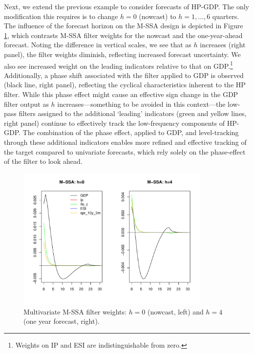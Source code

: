 \documentclass[11pt,a4paper]{article}
\begin{document}
Next, we extend the previous example to consider forecasts of HP-GDP. The only modification this requires is to change $h=0$ (nowcast) to $h=1,...,6$ quarters. %
The influence of the forecast horizon on the M-SSA design is depicted in Figure \ref{bk_h}, which contrasts M-SSA filter weights for the nowcast and the one-year-ahead forecast. Noting the difference in vertical scales, we see that as $h$ increases (right panel), the filter weights diminish, reflecting increased forecast uncertainty. We also see increased weight on the leading indicators relative to that on GDP.\footnote{Weights on IP and ESI are indistinguishable from zero.} Additionally, a phase shift associated with the filter applied to GDP is observed (black line, right panel), reflecting the cyclical characteristics inherent to the HP filter. While this phase effect might cause an effective sign change in the GDP filter output as $h$ increases—something to be avoided in this context—the low-pass filters assigned to the additional  `leading' indicators (green and yellow lines, right panel) continue to effectively track the low-frequency components of HP-GDP. The combination of the phase effect, applied to GDP, and level-tracking through these additional indicators enables more refined and effective tracking of the target compared to univariate forecasts, which rely solely on the phase-effect of the filter to look ahead.

\begin{figure}[H]
    \begin{center}
        \includegraphics[width=0.85\textwidth]{./Figures/bk_h.pdf}
        \caption{Multivariate M-SSA filter weights: $h=0$ (nowcast, left) and $h=4$ (one year forecast, right).
        \label{bk_h}}
    \end{center}
\end{figure}
\end{document}
